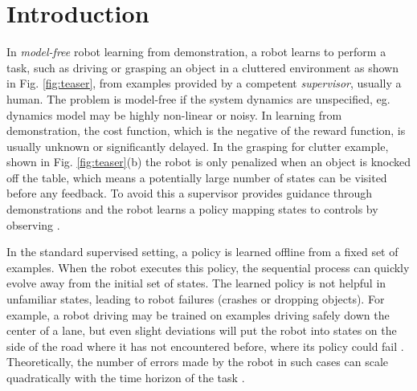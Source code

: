 \documentclass[10pt, conference]{ieeeconf}      %
\begin{document}

\section{Introduction} 


In \emph{model-free} robot learning from demonstration, a robot learns to perform a task, such as driving or grasping an object in a cluttered environment as shown in Fig. \ref{fig:teaser}, from examples provided by a competent \emph{supervisor}, usually a human. The problem is model-free if  the system dynamics are unspecified, eg. dynamics model may be highly non-linear or noisy. In learning from demonstration, the cost function, which is the negative of the reward function, is usually unknown or significantly delayed. In the grasping for clutter example, shown in Fig. \ref{fig:teaser}(b) the robot is only penalized when an object is knocked off the table, which means a potentially large number of states can be visited before any feedback. To avoid this a supervisor provides guidance through demonstrations and the robot learns a policy mapping states to controls by observing \cite{argall2009survey}.  

In the standard supervised setting, a policy is learned offline from a fixed set of examples. When the robot executes this policy, the sequential process can quickly evolve away from the initial set of states.  The learned policy is not helpful in unfamiliar states, leading to robot failures (crashes or dropping objects).  For example, a robot driving may be trained on examples driving safely down the center of a lane, but even slight deviations will put the robot into states on the side of the road where it has not encountered before, where its policy could  fail \cite{pomerleau1989alvinn}. Theoretically, the number of errors made by the robot in such cases  can scale quadratically with the time horizon of the task \cite{ross2010efficient}.
\end{document}
